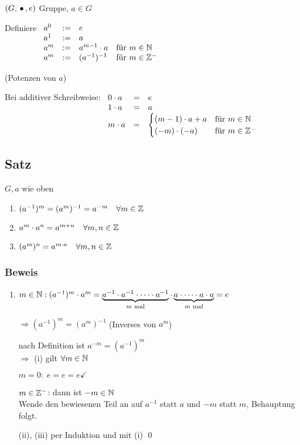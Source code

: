 $(G, \,{\bullet}\,, e)$ Gruppe, $a \in G$

Definiere
$\begin{array}[t]{lcll}
a^0	&:=& e \\
a^1 &:=& a \\
a^m &:=& a^{m-1} \cdot a & \text{für } m \in \mathbb{N} \\
a^m &:=& (a^{-1})^{-1} 	& \text{für } m \in \mathbb{Z}^-
\end{array}$

(Potenzen von $a$)

Bei additiver Schreibweise:
$\begin{array}[t]{lcl}
0 \cdot a &=& e \\
1 \cdot a &=& a \\
m \cdot a &=& 
\begin{cases}
(m-1) \cdot a + a & \text{für } m \in \mathbb{N} \\
(-m) \cdot (-a) 	& \text{für } m \in \mathbb{Z}^-
\end{cases}
\end{array}$

\subsection[Satz: Potenzgesetze]{Satz}
\label{potenzgesetze}
$G, a$ wie oben

{\renewcommand{\labelenumi}{(\roman{enumi})}
\begin{enumerate}
	\item
	$(a^{-1})^m = (a^m)^{-1} = a^{-m} \quad \forall m \in \mathbb{Z}$
	
	\item
	$a^m \cdot a^n = a^{m+n} \quad \forall m, n \in \mathbb{Z}$
	
	\item
	$(a^m)^n=a^{m \cdot n} \quad \forall m, n \in \mathbb{Z}$
\end{enumerate}

\subsubsection*{Beweis}
\begin{enumerate}
	\item
	$m \in \mathbb{N}: (a^{-1})^m \cdot a^m = \underbrace{a^{-1} \cdot a^{-1}\cdot \dots \cdot a^{-1}}_{m \text{ mal}} \cdot \underbrace{a \cdot \dots \cdot a \cdot a}_{m \text{ mal}} = e$
	
	$\Rightarrow (a^{-1})^m = (a^m)^{-1}$ (Inverses von $a^m$)
	
	nach Definition ist $a^{-m} = (a^{-1})^m$
	\\ $\Rightarrow $ (i) gilt $\forall m \in \mathbb{N}$
	
	$m = 0: \; e = e = e \checkmark$
	
	$m \in \mathbb{Z}^-$: dann ist $-m \in \mathbb{N}$
	\\ Wende den bewiesenen Teil an auf $a^{-1}$ statt $a$ und $-m$ statt $m$, Behauptung folgt.
	
	\item[(ii), (iii)]
	per Induktion und mit (i) \qed
\end{enumerate}}

